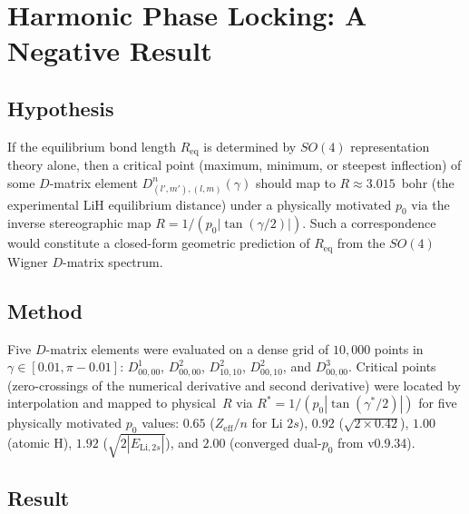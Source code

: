 
\section{Harmonic Phase Locking: A Negative Result}
\label{sec:phase_lock}

\subsection{Hypothesis}

If the equilibrium bond length $R_{\text{eq}}$ is determined by $SO(4)$
representation theory alone, then a critical point (maximum, minimum, or
steepest inflection) of some $D$-matrix element
$D^n_{(l',m'),(l,m)}(\gamma)$ should map to $R \approx 3.015$~bohr
(the experimental LiH equilibrium distance) under a physically motivated
$p_0$ via the inverse stereographic map $R = 1/(p_0 |\tan(\gamma/2)|)$.
Such a correspondence would constitute a closed-form geometric prediction
of $R_{\text{eq}}$ from the $SO(4)$ Wigner $D$-matrix spectrum.

\subsection{Method}

Five $D$-matrix elements were evaluated on a dense grid of $10{,}000$
points in $\gamma \in [0.01, \pi - 0.01]$:
$D^1_{00,00}$, $D^2_{00,00}$, $D^2_{10,10}$, $D^2_{00,10}$, and
$D^3_{00,00}$.
Critical points (zero-crossings of the numerical derivative and second
derivative) were located by interpolation and mapped to physical~$R$ via
$R^* = 1/(p_0 |\tan(\gamma^*/2)|)$ for five physically motivated $p_0$
values: $0.65$ ($Z_{\text{eff}}/n$ for Li $2s$), $0.92$
($\sqrt{2 \times 0.42}$), $1.00$ (atomic H), $1.92$
($\sqrt{2|E_{\text{Li},2s}|}$), and $2.00$ (converged dual-$p_0$ from
v0.9.34).

\subsection{Result}

